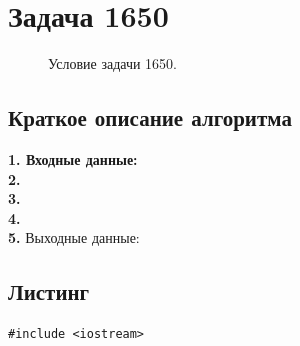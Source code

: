\documentclass[a5paper, 10pt]{article}
\theoremstyle{definition}
\theoremstyle{plain}
\theoremstyle{remark}
\begin{document}
\newpage
\section{Задача 1650}

\begin{figure}[h!]
\caption{Условие задачи 1650.}
\end{figure}

\subsection{Краткое описание алгоритма}
\textbf{1. Входные данные:} \\
\textbf{2.}  \\
\textbf{3.}  \\
\textbf{4.}  \\
\textbf{5.} Выходные данные: 

\subsection{Листинг}

\begin{center}
\begin{lstlisting}[label=some-code,caption={Исходный код для 1650}]
#include <iostream>


\end{lstlisting}
\end{center}
\end{document}
